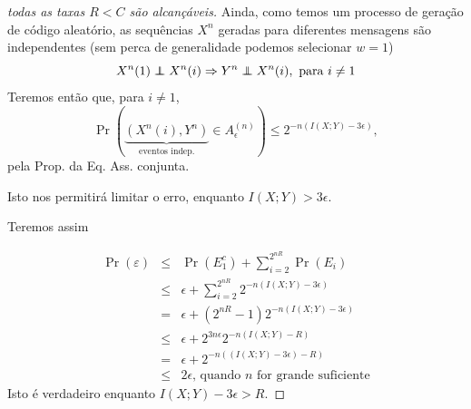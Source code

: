 \begin{frame}[allowframebreaks]
\begin{proof}[todas as taxas $R < C$ são alcançáveis]
  \proofbreak

  Ainda, como temos um processo de geração de código aleatório, as sequências $X^n$ geradas 
  para diferentes mensagens são independentes (sem perca de generalidade podemos selecionar $w=1$)
  \begin{equation}
  X^n(1) \independent X^n(i) \Rightarrow Y^n \independent X^n(i) , \text{ para } i \neq 1
  \end{equation}
  Teremos então que, para $i \neq 1$,
  \begin{equation}
  \Pr ( \underbrace{(X^n(i) , Y^n)}_{\text{eventos indep.}} \in A_{\epsilon}^{(n)} ) \leq 2^{-n (I(X;Y) - 3 \epsilon)} ,
  \end{equation}
  pela Prop. da Eq. Ass. conjunta.
 
  Isto nos permitirá limitar o erro, enquanto $I(X;Y) > 3\epsilon$.

  \proofbreak

  Teremos assim

  \vspace{-0.75cm}
  \begin{eqnarray}
  \Pr(\varepsilon) &\leq& \Pr(E_1^c) + \sum_{i=2}^{2^{nR}} \Pr(E_i) \nonumber \\
	&\leq& \epsilon + \sum_{i=2}^{2^{nR}} 2^{-n(I(X;Y)-3\epsilon)} \nonumber \\
	&=& \epsilon + (2^{nR} - 1) 2^{-n(I(X;Y)-3\epsilon)} \nonumber \\
	&\leq& \epsilon + 2^{3n\epsilon} 2^{-n(I(X;Y)-R)} \nonumber \\
	&=& \epsilon + 2^{-n((I(X;Y)-3\epsilon)-R)} \\
	&\leq& 2 \epsilon \text{, quando $n$ for grande suficiente}
  \end{eqnarray}
  \vspace{-0.3cm}
  Isto é verdadeiro enquanto $I(X;Y) -3\epsilon > R$.

  \proofbreak


\end{proof}
\end{frame}
